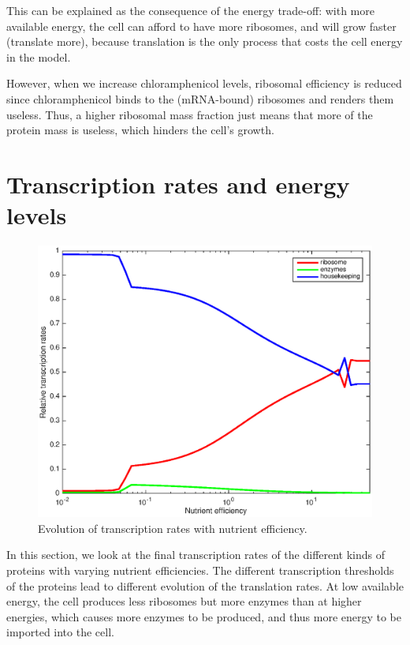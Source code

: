 \documentclass[a4paper]{article}
\begin{document}
This can be explained as the consequence of the energy trade-off: with more available energy, the cell can afford to have more ribosomes, and will grow faster (translate more), because translation is the only process that costs the cell energy in the model.

However, when we increase chloramphenicol levels, ribosomal efficiency is reduced since chloramphenicol binds to the (mRNA-bound) ribosomes and renders them useless.
Thus, a higher ribosomal mass fraction just means that more of the protein mass is useless, which hinders the cell's growth.

\FloatBarrier

\section{Transcription rates and energy levels}

\begin{figure}[h]
\includegraphics[width=\textwidth]{transcription.eps}
\caption{Evolution of transcription rates with nutrient efficiency.}
\label{trans}
\end{figure}

In this section, we look at the final transcription rates of the different kinds of proteins with varying nutrient efficiencies.
The different transcription thresholds of the proteins lead to different evolution of the translation rates.
At low available energy, the cell produces less ribosomes but more enzymes than at higher energies, which causes more enzymes to be produced, and thus more energy to be imported into the cell.
\end{document}
